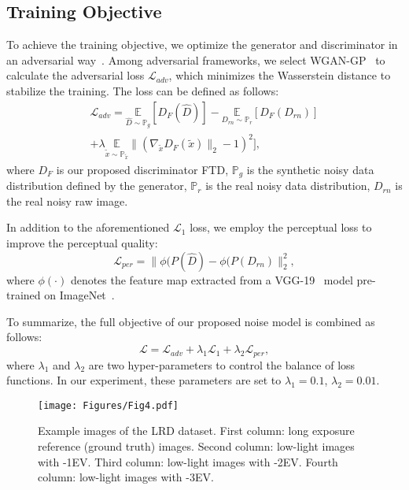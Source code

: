 \documentclass[10pt,twocolumn,letterpaper]{article}
\begin{document}
\subsection{Training Objective}
To achieve the training objective, we optimize the generator and discriminator in an adversarial way~\cite{goodfellow2020generative}. Among adversarial frameworks, we select WGAN-GP~\cite{gulrajani2017improved} to calculate the adversarial loss $\mathcal{L}_{adv}$, which minimizes the Wasserstein distance to stabilize the training. The loss can be defined as follows:
\begin{multline}
    \mathcal{L}_{adv} = \underset{\hat{D} \sim \mathbb{P}_g}{\mathbb{E}} [{D}_{F}(\hat{D})] - \underset{{D}_{rn} \sim \mathbb{P}_r}{\mathbb{E}} [{D}_{F}({D}_{rn})]\\
    + \lambda \underset{\tilde{x} \sim \mathbb{P}_{\tilde{x}}}{\mathbb{E}} \| (\nabla_{\tilde{x}} {D}_{F}(\tilde{x})\|_2 - 1)^2] ,
\end{multline}
\noindent where ${D}_{F}$ is our proposed discriminator FTD, $\mathbb{P}_{g}$ is the synthetic noisy data distribution defined by the generator, $\mathbb{P}_{r}$ is the real noisy data distribution, ${D}_{rn}$ is the real noisy raw image.

In addition to the aforementioned $\mathcal{L}_{1}$ loss, we employ the perceptual loss to improve the perceptual quality:
\begin{equation}
\mathcal{L}_{per} = \parallel \phi(P(\hat{D}) - \phi(P(D_{rn})\parallel_2^2 ,
\end{equation}
\noindent where $\phi(\cdot)$ denotes the feature map extracted from a VGG-19~\cite{simonyan2014very} model pre-trained on ImageNet~\cite{deng2009imagenet}.

To summarize, the full objective of our proposed noise model is combined as follows:
\begin{equation}
\mathcal{L} = \mathcal{L}_{adv} + \lambda_{1}\mathcal{L}_{1} + \lambda_{2}\mathcal{L}_{per} ,
\end{equation}
\noindent where $\lambda_{1}$ and $\lambda_{2}$ are two hyper-parameters to control the balance of loss functions. In our experiment, these parameters are set to $\lambda_{1}= 0.1$, $\lambda_{2}= 0.01$.

\begin{figure}[t]
\centering
\texttt{[image: Figures/Fig4.pdf]}
\caption{Example images of the LRD dataset. First column: long exposure reference (ground truth) images. Second column: low-light images with -1EV. Third column: low-light images with -2EV. Fourth column: low-light images with -3EV.}
\label{fig:dataset}
\vspace{-1ex}
\end{figure}
\end{document}
